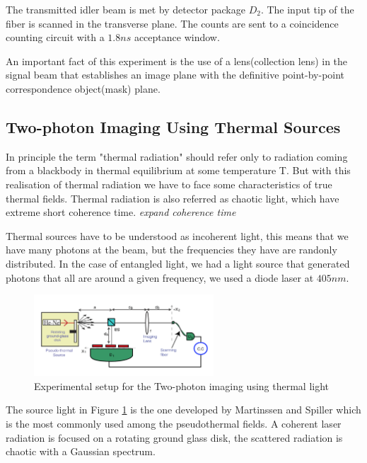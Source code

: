 The transmitted idler beam is met by detector 
package $D_2$. The input tip of the fiber is scanned in the transverse 
plane. The counts are sent to a coincidence 
counting circuit with a $1.8ns$ acceptance window.


An important fact of this experiment is the use of a lens(collection lens) in the signal beam that establishes an image plane with the definitive point-by-point correspondence object(mask) plane.




\subsection{Two-photon Imaging Using Thermal Sources}

In principle the term "thermal radiation" should refer only to radiation coming 
from a blackbody in thermal equilibrium at some temperature T. But with this realisation of thermal radiation
we have to face some characteristics of true thermal fields. Thermal radiation is also referred as chaotic light, which
have extreme short coherence time.  \textit{expand coherence time}

Thermal sources have to be understood as incoherent light, this means that we have many photons at the beam, but the frequencies they have are 
randonly distributed. In the case of entangled light, we had a light source that generated photons that all are around a given frequency, we used a diode laser at $405nm$.


\begin{figure}[h!]
\centering
\includegraphics[width=0.6\textwidth]{Figures/thermalSetup.png}
\caption{Experimental setup for the Two-photon imaging using thermal light} 
\label{fig:thermalSetup}
\end{figure}
The source light in Figure \ref{fig:thermalSetup} is the one developed by Martinssen and Spiller\cite{intensity}
which is the most commonly used among the pseudothermal fields.
A  coherent laser radiation is focused on a rotating ground glass disk, 
the scattered radiation is chaotic with a Gaussian spectrum.




